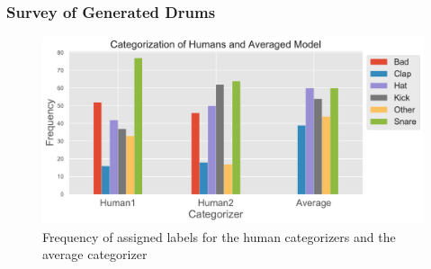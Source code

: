 \documentclass{nime-alternate} %
\begin{document}
\subsubsection{Survey of Generated Drums}
\label{survey}
\begin{figure}[H]
\centering
\includegraphics[width=1.1\linewidth]{images/cat.pdf}
\caption{Frequency of assigned labels for the human categorizers and the average categorizer}
\label{fig:freq-survey}
\end{figure}
\end{document}
